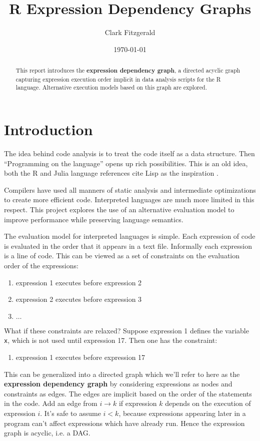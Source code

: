 \documentclass[12pt]{article}
\begin{document}
\title{R Expression Dependency Graphs}
\date{\today}
\author{Clark Fitzgerald}
\maketitle

\begin{abstract}

    This report introduces the \textbf{expression dependency graph}, a
    directed acyclic graph capturing expression execution order implicit in
    data analysis scripts for the R language. Alternative execution models
    based on this graph are explored.

\end{abstract}

\section{Introduction}

The idea behind code analysis is to treat the code itself as a data
structure. Then ``Programming on the language'' opens up rich possibilities.
This is an old idea, both the R and Julia language references cite Lisp
as the inspiration \cite{Rlang} \cite{bezanson2014julia}.

Compilers have used all manners of static analysis and
intermediate optimizations to create more efficient code. Interpreted
languages are much more limited in this respect. This project explores
the use of an alternative evaluation model to improve performance while
preserving language semantics.

The evaluation model for interpreted languages is simple. Each
expression of code is evaluated in the order that it appears in a text file. Informally
each expression is a line of code. This can be
viewed as a set of constraints on the evaluation order of the expressions:
\begin{enumerate}
    \item expression 1 executes before expression 2
    \item expression 2 executes before expression 3
    \item $\dots$
\end{enumerate}
What if these constraints are relaxed? Suppose expression 1 defines the variable
\texttt{x}, which is not used until expression 17. Then one has the
constraint:
\begin{enumerate}
    \item expression 1 executes before expression 17
\end{enumerate}
This can be generalized into a directed graph which we'll refer to here as
the \textbf{expression dependency graph} by considering expressions as
nodes and constraints as edges. The edges are implicit based on the order
of the statements in the code. Add an edge from $i \rightarrow k$ if
expression $k$ depends on the execution of expression $i$.  It's safe to
assume $i < k$, because expressions appearing later in a program can't
affect expressions which have already run. Hence the expression graph is
acyclic, i.e. a DAG.
\end{document}
